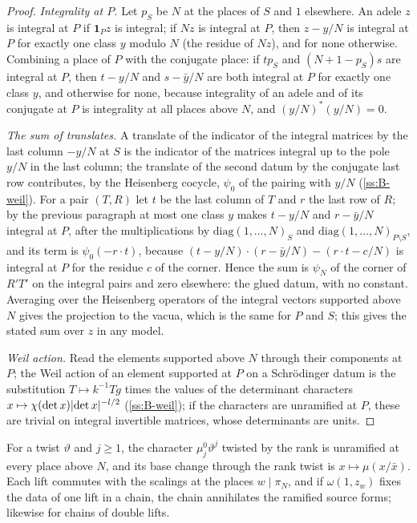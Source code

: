 \begin{proof}
\emph{Integrality at $P$.} Let $p_S$ be $N$ at the places of $S$ and $1$ elsewhere. An adele $z$ is integral at $P$ if $\mathbf1_Pz$ is integral; if $Nz$ is integral at $P$, then $z-y/N$ is integral at $P$ for exactly one class $y$ modulo $N$ (the residue of $Nz$), and for none otherwise. Combining a place of $P$ with the conjugate place: if $tp_S$ and
$(N+1-p_S)s$ are integral at $P$, then $t-y/N$ and $s-\bar y/N$ are both integral at $P$ for exactly one class $y$, and otherwise for none, because integrality of an adele and of its conjugate at $P$ is integrality at all places above $N$, and $(y/N)^*(y/N)=0$.

\emph{The sum of translates.} A translate of the indicator of the integral matrices by the last column $-y/N$ at $S$ is the indicator of the matrices integral up to the pole $y/N$ in the last column; the translate of the second datum by the conjugate last row contributes, by the Heisenberg cocycle, $\psi_0$ of the pairing with $y/N$
(\cref{ss:B-weil}). For a pair $(T,R)$ let $t$ be the last column of $T$ and $r$ the last row of $R$; by the previous paragraph at most one class $y$ makes $t-y/N$ and $r-\bar y/N$ integral at $P$, after the multiplications by $\mathrm{diag}(1,\dots,N)_S$ and $\mathrm{diag}(1,\dots,N)_{P\setminus S}$, and its term is $\psi_0(-r\cdot t)$, because
$(t-y/N)\cdot(r-\bar y/N)-(r\cdot t-c/N)$ is integral at $P$ for the residue $c$ of the corner. Hence the sum is $\psi_N$ of the corner of $R'T'$ on the integral pairs and zero elsewhere: the glued datum, with no constant. Averaging over the Heisenberg operators of the integral vectors supported above $N$ gives the projection to the
vacua, which is the same for $P$ and $S$; this gives the stated sum over $z$ in any model.

\emph{Weil action.} Read the elements supported above $N$ through their components at $P$; the Weil action of an element supported at $P$ on a Schr\"odinger datum is the substitution $T\mapsto k^{-1}Tg$ times the values of the determinant characters $x\mapsto\chi(\det x)\lvert \det x\rvert^{-l/2}$ (\cref{ss:B-weil}); if the characters are
unramified at $P$, these are trivial on integral invertible matrices, whose determinants are units.
\end{proof}

\begin{proposition}\label{prop:characters-N}
For a twist $\vartheta$ and $j\ge1$, the character $\mu^0_j\vartheta^j$ twisted by the rank is unramified at every place above
$N$, and its base change through the rank twist is $x\mapsto\mu(x/\bar x)$. Each lift commutes with the scalings at the
places $w\mid\pi_N$, and if $\omega(1,z_w)$ fixes the data of one lift in a chain, the chain annihilates the ramified
source forms; likewise for chains of double lifts.
\end{proposition}

